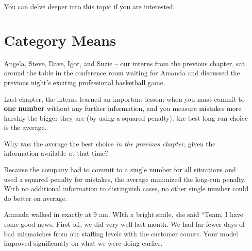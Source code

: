 \documentclass[
  12pt,
  letterpaper,
  DIV=11,
  numbers=noendperiod]{scrreprt}
\begin{document}
You can delve deeper into this topic if you are interested.

\chapter{Category Means}\label{sec-category-means}

Angela, Steve, Dave, Igor, and Suzie -- our interns from the previous
chapter, sat around the table in the conference room waiting for Amanda
and discussed the previous night's exciting professional basketball
game.

Last chapter, the interns learned an important lesson: when you must
commit to \textbf{one number} without any further information, and you
measure mistakes more harshly the bigger they are (by using a squared
penalty), the best long-run choice is the average.

\begin{tcolorbox}[enhanced jigsaw, colback=white, leftrule=.75mm, toprule=.15mm, bottomtitle=1mm, breakable, coltitle=black, toptitle=1mm, title={Quick Check}, opacitybacktitle=0.6, colbacktitle=quarto-callout-note-color!10!white, arc=.35mm, left=2mm, colframe=quarto-callout-note-color-frame, titlerule=0mm, rightrule=.15mm, bottomrule=.15mm, opacityback=0]

Why was the average the best choice \emph{in the previous chapter},
given the information available at that time?

\end{tcolorbox}

\begin{tcolorbox}[enhanced jigsaw, colback=white, leftrule=.75mm, toprule=.15mm, bottomtitle=1mm, breakable, coltitle=black, toptitle=1mm, title={Suggested answer}, opacitybacktitle=0.6, colbacktitle=quarto-callout-note-color!10!white, arc=.35mm, left=2mm, colframe=quarto-callout-note-color-frame, titlerule=0mm, rightrule=.15mm, bottomrule=.15mm, opacityback=0]

Because the company had to commit to a single number for all situations
and used a squared penalty for mistakes, the average minimized the
long-run penalty. With no additional information to distinguish cases,
no other single number could do better on average.

\end{tcolorbox}

Amanda walked in exactly at 9 am. WIth a bright smile, she said ``Team,
I have some good news. First off, we did very well last month. We had
far fewer days of bad mismatches from our staffing levels with the
customer counts. Your model improved significantly on what we were doing
earlier.
\end{document}

